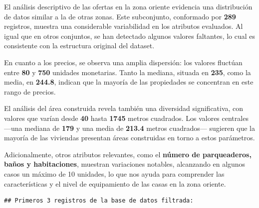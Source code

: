 \documentclass[
]{article}
\begin{document}
El análisis descriptivo de las ofertas en la zona oriente evidencia una
distribución de datos similar a la de otras zonas. Este subconjunto,
conformado por \textbf{289} registros, muestra una considerable
variabilidad en los atributos evaluados. Al igual que en otros
conjuntos, se han detectado algunos valores faltantes, lo cual es
consistente con la estructura original del dataset.

En cuanto a los precios, se observa una amplia dispersión: los valores
fluctúan entre \textbf{80} y \textbf{750} unidades monetarias. Tanto la
mediana, situada en \textbf{235}, como la media, en \textbf{244.8},
indican que la mayoría de las propiedades se concentran en este rango de
precios.

El análisis del área construida revela también una diversidad
significativa, con valores que varían desde \textbf{40} hasta
\textbf{1745} metros cuadrados. Los valores centrales ---una mediana de
\textbf{179} y una media de \textbf{213.4} metros cuadrados--- sugieren
que la mayoría de las viviendas presentan áreas construidas en torno a
estos parámetros.

Adicionalmente, otros atributos relevantes, como el \textbf{número de
parqueaderos, baños y habitaciones}, muestran variaciones notables,
alcanzando en algunos casos un máximo de 10 unidades, lo que nos ayuda
para comprender las características y el nivel de equipamiento de las
casas en la zona oriente.

\begin{verbatim}
## Primeros 3 registros de la base de datos filtrada:
\end{verbatim}
\end{document}

